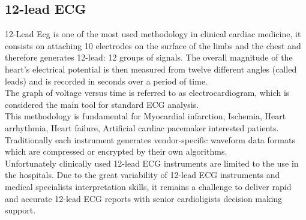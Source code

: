 \subsection{12-lead ECG}
\label{subsection:12leadecg}
12-Lead Ecg is one of the most used methodology in clinical cardiac medicine, it consists on attaching 10 electrodes on the surface of the limbs and the chest and therefore generates 12-lead: 12 groups of signals. The overall magnitude of the heart's electrical potential is then measured from twelve different angles (called leads) and is recorded in seconds over a period of time.\\
The graph of voltage versus time is referred to as electrocardiogram, which is considered the main tool for standard ECG analysis. \cite{electrocardiography_it} \cite{electrocardiography_en}\\
This methodology is fundamental for Myocardial infarction, Ischemia, Heart arrhythmia, Heart failure, Artificial cardiac pacemaker interested patients. Traditionally each instrument generates vendor-specific waveform data formats which are compressed or encrypted by their own algorithms.\\
Unfortunately clinically used 12-lead ECG instruments are limited to the use in the hospitals. Due to the great variability of 12-lead ECG instruments and medical specialists interpretation skills, it remains a challenge to deliver rapid and accurate 12-lead ECG reports with senior cardioligists decision making support.\cite{Hsieh2012}

